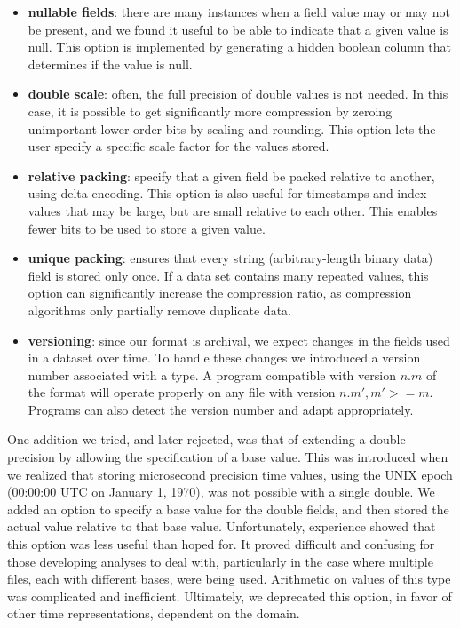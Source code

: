 \documentclass{acm_proc_article-sp}
\begin{document}
\begin{itemize}

\item \textbf{nullable fields}: there are many instances when a field
value may or may not be present, and we found it useful to be able to
indicate that a given value is null. This option is implemented by
generating a hidden boolean column that determines if the value is null.

\item \textbf{double scale}: often, the full precision of double
values is not needed. In this case, it is possible to get
significantly more compression by zeroing unimportant 
lower-order bits 
by scaling and rounding. This option lets the user specify
a specific scale factor for the values stored.

\item \textbf{relative packing}: specify that a given field be packed
relative to another, using delta encoding. This option is also useful
for timestamps and index values that may be large, but are small
relative to each other. This enables fewer bits to be used to store a
given value.

\item \textbf{unique packing}: ensures that every string 
(arbitrary-length binary data) field is stored only once. If a 
data set
contains many repeated values, this option can significantly increase
the 
compression ratio, as compression algorithms only partially
remove duplicate data.

\item \textbf{versioning}: since our format is archival, we expect
changes in the fields used in a dataset over time.  To handle these
changes we 
introduced a version number associated with a type.
A program compatible with version $n.m$ of the format will operate
properly on any file with version $n.m', m' >= m$.  Programs can also
detect the version number and adapt appropriately.

\end{itemize}

One addition we tried, and later rejected, was that of extending a
double 
precision by allowing the specification of a base value.
This was introduced when we realized that storing microsecond precision
time values, using the UNIX epoch (00:00:00 UTC on January 1, 1970),
was not possible with a single double. We added an option to
specify a base value for the double fields, and then stored the actual
value relative to that base value.
Unfortunately, experience showed that this option
was less useful than hoped for. It proved difficult and confusing for
those developing analyses to deal with, particularly in the case where
multiple files, each with different bases, were being used. Arithmetic
on values of this type was complicated and inefficient. Ultimately, we
deprecated this option, in favor of other time representations,
dependent on the domain. 
\end{document}
